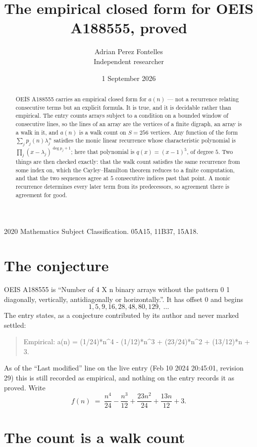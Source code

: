 \documentclass[11pt,a4paper]{article}
\title{The empirical closed form for OEIS A188555, proved}
\author{Adrian Perez Fontelles\\ \small Independent researcher}
\date{1 September 2026}
\theoremstyle{plain}
\theoremstyle{definition}
\begin{document}
\maketitle

\begin{abstract}
OEIS A188555 carries an empirical closed form for $a(n)$ --- not a recurrence relating
consecutive terms but an explicit formula. It is true, and it is decidable rather than
empirical. The entry counts arrays subject to a condition on a bounded window of consecutive lines, so the lines of an array are the
vertices of a finite digraph, an array is a walk in it, and $a(n)$ is a walk count on
$S=256$ vertices. Any function of the form $\sum_j p_j(n)\lambda_j^{\,n}$ satisfies the
monic linear recurrence whose characteristic polynomial is
$\prod_j(x-\lambda_j)^{\deg p_j+1}$; here that polynomial is $q(x)=(x-1)^{5}$, of degree
$5$. Two things are then checked exactly: that the walk count satisfies the same
recurrence from some index on, which the Cayley--Hamilton theorem reduces to a finite
computation, and that the two sequences agree at $5$ consecutive indices past that
point. A monic recurrence determines every later term from its predecessors, so agreement
there is agreement for good.
\end{abstract}

\noindent\small 2020 Mathematics Subject Classification. 05A15, 11B37, 15A18.\normalsize

\section{The conjecture}

OEIS A188555 is ``Number of 4 X n binary arrays without the pattern 0 1 diagonally, vertically, antidiagonally or horizontally.''. It has offset $0$ and begins
\[
1, 5, 9, 16, 28, 48, 80, 129,\ \dots
\]
The entry states, as a conjecture contributed by its author and never marked settled:
\begin{quote}
Empirical: a(n) = (1/24)*n\^{}4 - (1/12)*n\^{}3 + (23/24)*n\^{}2 + (13/12)*n + 3.
\end{quote}
As of the ``Last modified'' line on the live entry (Feb 10 2024 20:45:01, revision 29) this is still
recorded as empirical, and nothing on the entry records it as proved. Write
\[
f(n)\;=\;\frac{n^{4}}{24} - \frac{n^{3}}{12} + \frac{23 n^{2}}{24} + \frac{13 n}{12} + 3.
\]

\section{The count is a walk count}
\end{document}
